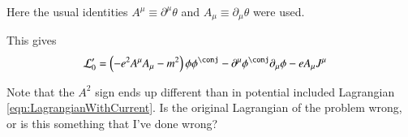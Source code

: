 \documentclass{article}
\begin{document}
Here the usual identities $A^\mu \equiv \partial^\mu \theta$ and $A_\mu \equiv \partial_\mu \theta$ were used.

This gives
\begin{align}
\LL_0'
&= 
\left( -e^2 A^\mu A_\mu - m^2 \right) \phi \phi^\conj - \partial^\mu \phi^\conj \partial_\mu \phi - e A_\mu J^\mu
\end{align}

Note that the $A^2$ sign ends up different than in potential included Lagrangian \ref{eqn:LagrangianWithCurrent}.  Is the original Lagrangian 
of the problem wrong, or is this something that I've done wrong?



\end{document}
